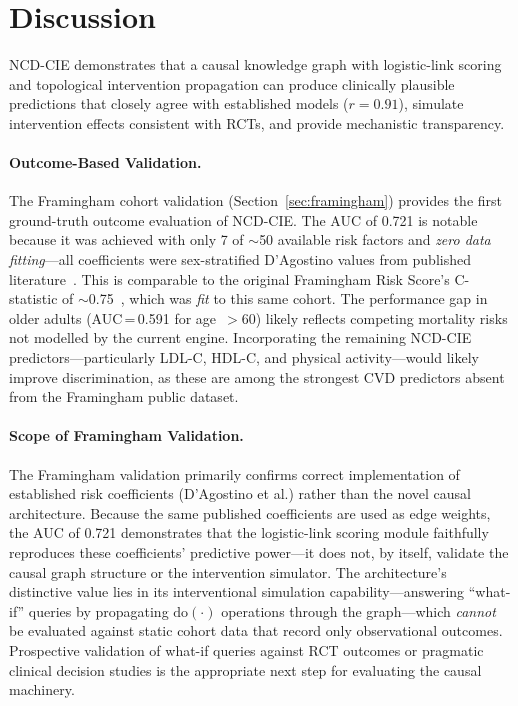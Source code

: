 \documentclass[runningheads]{llncs}
\begin{document}
\section{Discussion}\label{sec:discussion}

NCD-CIE demonstrates that a causal knowledge graph with logistic-link
scoring and topological intervention propagation can produce
clinically plausible predictions that closely agree with established
models ($r = 0.91$), simulate intervention effects consistent with
RCTs, and provide mechanistic transparency.

\paragraph{Outcome-Based Validation.}
The Framingham cohort validation (Section~\ref{sec:framingham})
provides the first ground-truth outcome evaluation of NCD-CIE.
The AUC of 0.721 is notable because it was achieved with only 7 of
${\sim}$50 available risk factors and \emph{zero data fitting}---all
coefficients were sex-stratified D'Agostino values from published
literature~\cite{dagostino2008}.  This is comparable to the original
Framingham Risk Score's C-statistic of
${\sim}$0.75~\cite{dagostino2008}, which was \emph{fit} to
this same cohort.  The performance gap in older adults
(AUC\,=\,0.591 for age~${>}$60) likely reflects competing mortality
risks not modelled by the current engine.  Incorporating the remaining
NCD-CIE predictors---particularly LDL-C, HDL-C, and physical
activity---would likely improve discrimination, as these are among the
strongest CVD predictors absent from the Framingham public dataset.

\paragraph{Scope of Framingham Validation.}
The Framingham validation primarily confirms correct implementation of
established risk coefficients (D'Agostino et al.) rather than the
novel causal architecture.  Because the same published coefficients
are used as edge weights, the AUC of 0.721 demonstrates that the
logistic-link scoring module faithfully reproduces these coefficients'
predictive power---it does not, by itself, validate the causal graph
structure or the intervention simulator.  The architecture's
distinctive value lies in its interventional simulation capability---answering
``what-if'' queries by propagating $\mathrm{do}(\cdot)$ operations
through the graph---which \emph{cannot} be evaluated against static
cohort data that record only observational outcomes.  Prospective
validation of what-if queries against RCT outcomes or pragmatic
clinical decision studies is the appropriate next step for evaluating
the causal machinery.
\end{document}
